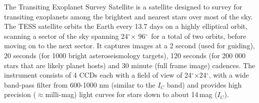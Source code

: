 \documentclass[sn-nature]{sn-jnl}%
\newcommand*\degr{\ensuremath{^\circ}}
\newcommand{\asas}{ASASSN-21qj}
\begin{document}








The Transiting Exoplanet Survey Satellite \cite[TESS; ][]{2015JATIS...1a4003R} is a satellite designed to survey for transiting exoplanets among the brightest and nearest stars over most of the sky.
%
The TESS satellite orbits the Earth every 13.7 days on a highly elliptical orbit, scanning a sector of the sky spanning 24\degr $\times$ 96\degr\ for a total of two orbits, before moving on to the next sector. 
%
It captures images at a 2 second (used for guiding), 20 seconds (for 1000 bright asteroseismology targets), 120 seconds (for 200 000 stars that are likely planet hosts) and 30 minute (full frame image) cadences.
%
The instrument consists of 4 CCDs each with a field of view of 24\degr$\times$24\degr, with a wide band-pass filter from 600-1000 nm (similar to the $I_C$ band) and provides high precision ($\approx$milli-mag) light curves for stars down to about 14\,mag ($I_C$).
%
\end{document}
